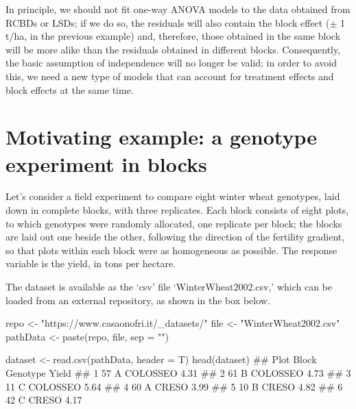 \documentclass[a4paper,12pt,oneside]{book}
\newenvironment{Shaded}{\begin{snugshade}}{\end{snugshade}}
\newcommand{\StringTok}[1]{#1}
\newcommand{\DocumentationTok}[1]{#1}
\newcommand{\OtherTok}[1]{#1}
\newcommand{\FunctionTok}[1]{#1}
\newcommand{\AttributeTok}[1]{#1}
\newcommand{\NormalTok}[1]{#1}
\begin{document}
In principle, we should not fit one-way ANOVA models to the data obtained from RCBDs or LSDs; if we do so, the residuals will also contain the block effect (\(\pm\) 1 t/ha, in the previous example) and, therefore, those obtained in the same block will be more alike than the residuals obtained in different blocks. Consequently, the basic assumption of independence will no longer be valid; in order to avoid this, we need a new type of models that can account for treatment effects and block effects at the same time.

\hypertarget{motivating-example-a-genotype-experiment-in-blocks}{%
\section{Motivating example: a genotype experiment in blocks}\label{motivating-example-a-genotype-experiment-in-blocks}}

Let's consider a field experiment to compare eight winter wheat genotypes, laid down in complete blocks, with three replicates. Each block consists of eight plots, to which genotypes were randomly allocated, one replicate per block; the blocks are laid out one beside the other, following the direction of the fertility gradient, so that plots within each block were as homogeneous as possible. The response variable is the yield, in tons per hectare.

The dataset is available as the `csv' file `WinterWheat2002.csv,' which can be loaded from an external repository, as shown in the box below.

\vspace{12pt}

\begin{Shaded}
\begin{Highlighting}[]
\NormalTok{repo }\OtherTok{\textless{}{-}} \StringTok{"https://www.casaonofri.it/\_datasets/"}
\NormalTok{file }\OtherTok{\textless{}{-}} \StringTok{"WinterWheat2002.csv"}
\NormalTok{pathData }\OtherTok{\textless{}{-}} \FunctionTok{paste}\NormalTok{(repo, file, }\AttributeTok{sep =} \StringTok{""}\NormalTok{)}

\NormalTok{dataset }\OtherTok{\textless{}{-}} \FunctionTok{read.csv}\NormalTok{(pathData, }\AttributeTok{header =}\NormalTok{ T)}
\FunctionTok{head}\NormalTok{(dataset)}
\DocumentationTok{\#\#   Plot Block Genotype Yield}
\DocumentationTok{\#\# 1   57     A COLOSSEO  4.31}
\DocumentationTok{\#\# 2   61     B COLOSSEO  4.73}
\DocumentationTok{\#\# 3   11     C COLOSSEO  5.64}
\DocumentationTok{\#\# 4   60     A    CRESO  3.99}
\DocumentationTok{\#\# 5   10     B    CRESO  4.82}
\DocumentationTok{\#\# 6   42     C    CRESO  4.17}
\end{Highlighting}
\end{Shaded}
\end{document}
